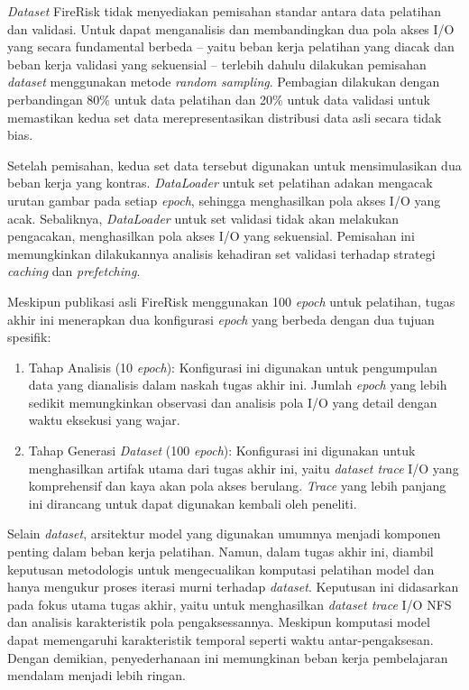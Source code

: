 \textit{Dataset} FireRisk tidak menyediakan pemisahan standar antara data pelatihan dan validasi. Untuk dapat menganalisis dan membandingkan dua pola akses I/O yang secara fundamental berbeda -- yaitu beban kerja pelatihan yang diacak dan beban kerja validasi yang sekuensial -- terlebih dahulu dilakukan pemisahan \textit{dataset} menggunakan metode \textit{random sampling}. Pembagian dilakukan dengan perbandingan 80\% untuk data pelatihan dan 20\% untuk data validasi untuk memastikan kedua set data merepresentasikan distribusi data asli secara tidak bias.

Setelah pemisahan, kedua set data tersebut digunakan untuk mensimulasikan dua beban kerja yang kontras. \textit{DataLoader} untuk set pelatihan adakan mengacak urutan gambar pada setiap \textit{epoch}, sehingga menghasilkan pola akses I/O yang acak. Sebaliknya, \textit{DataLoader} untuk set validasi tidak akan melakukan pengacakan, menghasilkan pola akses I/O yang sekuensial. Pemisahan ini memungkinkan dilakukannya analisis kehadiran set validasi terhadap strategi \textit{caching} dan \textit{prefetching}.

Meskipun publikasi asli FireRisk menggunakan 100 \textit{epoch} untuk pelatihan, tugas akhir ini menerapkan dua konfigurasi \textit{epoch} yang berbeda dengan dua tujuan spesifik:
\begin{enumerate}
    \item Tahap Analisis (10 \textit{epoch}): Konfigurasi ini digunakan untuk pengumpulan data yang dianalisis dalam naskah tugas akhir ini. Jumlah \textit{epoch} yang lebih sedikit memungkinkan observasi dan analisis pola I/O yang detail dengan waktu eksekusi yang wajar.
    \item Tahap Generasi \textit{Dataset} (100 \textit{epoch}): Konfigurasi ini digunakan untuk menghasilkan artifak utama dari tugas akhir ini, yaitu \textit{dataset trace} I/O yang komprehensif dan kaya akan pola akses berulang. \textit{Trace} yang lebih panjang ini dirancang untuk dapat digunakan kembali oleh peneliti.
\end{enumerate}

Selain \textit{dataset}, arsitektur model yang digunakan umumnya menjadi komponen penting dalam beban kerja pelatihan. Namun, dalam tugas akhir ini, diambil keputusan metodologis untuk mengecualikan komputasi pelatihan model dan hanya mengukur proses iterasi murni terhadap \textit{dataset}. Keputusan ini didasarkan pada fokus utama tugas akhir, yaitu untuk menghasilkan \textit{dataset trace} I/O NFS dan analisis karakteristik pola pengaksessannya. Meskipun komputasi model dapat memengaruhi karakteristik temporal seperti waktu antar-pengaksesan. Dengan demikian, penyederhanaan ini memungkinan beban kerja pembelajaran mendalam menjadi lebih ringan.

